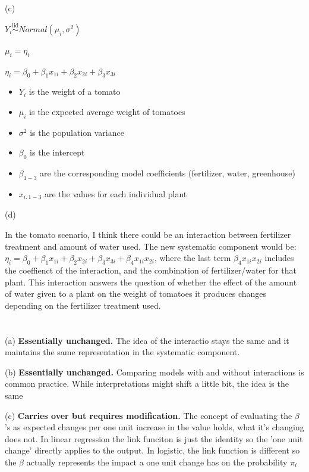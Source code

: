 \documentclass{article}
\newcommand{\iiddist}{\overset{\mathrm{iid}}{\sim}}
\begin{document}
(c)

$Y_i \iiddist Normal(\mu_i, \sigma^2)$

$\mu_i = \eta_i$

$\eta_i = \beta_0 + \beta_1 x_{1i} + \beta_2 x_{2i} + \beta_3 x_{3i}$

\begin{itemize}
    \item $Y_i$ is the weight of a tomato
    \item $\mu_i$ is the expected average weight of tomatoes
    \item $\sigma^2$ is the population variance
    \item $\beta_0$ is the intercept 
    \item $\beta_{1-3}$ are the corresponding model coefficients (fertilizer, water, greenhouse)
    \item $x_{i, 1-3}$ are the values for each individual plant
\end{itemize}

(d)

In the tomato scenario, I think there could be an interaction between fertilizer treatment and amount of water used. The new systematic component would be: $\eta_i = \beta_0 + \beta_1 x_{1i} + \beta_2 x_{2i} + \beta_3 x_{3i} + \beta_4 x_{1i}x_{2i}$, where the last term $\beta_4 x_{1i}x_{2i}$ includes the coeffienct of the interaction, and the combination of fertilizer/water for that plant. This interaction answers the question of whether the effect of the amount of water given to a plant on the weight of tomatoes it produces changes depending on the fertilizer treatment used. 



\section{}

(a) \textbf{Essentially unchanged.} The idea of the interactio stays the same and it maintains the same representation in the systematic component. 

(b) \textbf{Essentially unchanged.} Comparing models with and without interactions is common practice. While interpretations might shift a little bit, the idea is the same

(c) \textbf{Carries over but requires modification.} The concept of evaluating the $\beta$'s as expected changes per one unit increase in the value holds, what it's changing does not. In linear regression the link funciton is just the identity so the 'one unit change' directly applies to the output. In logistic, the link function is different so the $\beta$ actually represents  the impact a one unit change has on the probability $\pi_i$
\end{document}
